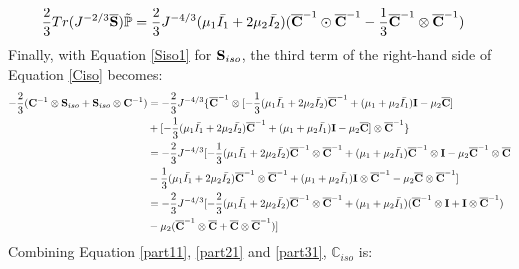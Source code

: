 \begin{equation} \label{part21}
\begin{split}
\frac{2}{3}Tr(J^{-2/3}\overline{\bold{S}})\tilde{\mathbb{P}}
&= \frac{2}{3}J^{-4/3}(\mu_1\bar{I_1} + 2\mu_2\bar{I_2})({\overline{\bold{C}}}^{-1} \odot {{\overline{\bold{C}}}}^{-1} - \frac{1}{3}{{\overline{\bold{C}}}}^{-1} \otimes {\overline{{\bold{C}}}}^{-1})
\end{split}
\end{equation}
Finally, with Equation \ref{Siso1} for $\bold{S}_{iso}$, the third term of the right-hand side of Equation \ref{Ciso} becomes:
\begin{equation} \label{part31}
\begin{split}
- \frac{2}{3}(\bold{C}^{-1}\otimes\bold{S}_{iso} + \bold{S}_{iso}\otimes \bold{C}^{-1})
&=
- \frac{2}{3}J^{-4/3} \{ {\overline{\bold{C}}}^{-1} \otimes [-\frac{1}{3}(\mu_1\bar{I_1} + 2\mu_2\bar{I_2}){\overline{\bold{C}}}^{-1} + (\mu_1 + \mu_2\bar{I_1})\bold{I} - \mu_2{\overline{\bold{C}}}] \\
&+
[-\frac{1}{3}(\mu_1\bar{I_1} + 2\mu_2\bar{I_2}){\overline{\bold{C}}}^{-1} + (\mu_1 + \mu_2\bar{I_1})\bold{I} - \mu_2{\overline{\bold{C}}}] \otimes {\overline{\bold{C}}}^{-1}\} \\
&=
- \frac{2}{3}J^{-4/3} [ -\frac{1}{3}(\mu_1\bar{I_1} + 2\mu_2\bar{I_2}) {\overline{\bold{C}}}^{-1} \otimes {\overline{\bold{C}}}^{-1} + (\mu_1 + \mu_2\bar{I_1}){\overline{\bold{C}}}^{-1}\otimes\bold{I} - \mu_2{\overline{\bold{C}}}^{-1} \otimes {\overline{\bold{C}}} \\
&-
\frac{1}{3}(\mu_1\bar{I_1} + 2\mu_2\bar{I_2}) {\overline{\bold{C}}}^{-1} \otimes {\overline{\bold{C}}}^{-1} + (\mu_1 + \mu_2\bar{I_1})\bold{I} \otimes {\overline{\bold{C}}}^{-1} - \mu_2{\overline{\bold{C}}} \otimes {\overline{\bold{C}}}^{-1}] \\
&=
 - \frac{2}{3}J^{-4/3} [ -\frac{2}{3}(\mu_1\bar{I_1} + 2\mu_2\bar{I_2}){\overline{\bold{C}}}^{-1} \otimes {\overline{\bold{C}}}^{-1} + (\mu_1+\mu_2\bar{I_1})({\overline{\bold{C}}}^{-1} \otimes \bold{I} + \bold{I} \otimes {\overline{\bold{C}}}^{-1})\\
&- \mu_2({\overline{\bold{C}}}^{-1} \otimes {\overline{\bold{C}}}+{\overline{\bold{C}}} \otimes {\overline{\bold{C}}}^{-1}) ]
\end{split}
\end{equation}
Combining Equation \ref{part11}, \ref{part21} and \ref{part31}, $\mathbb{C}_{iso}$ is:
